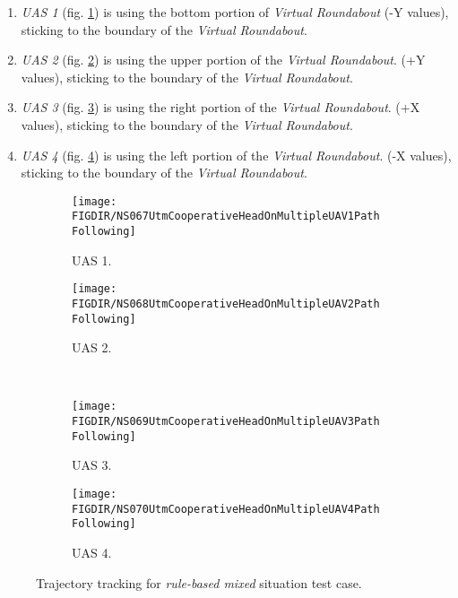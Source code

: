 \begin{enumerate}
	\item \emph{UAS 1} (fig. \ref{fig:ruleBasedMixedPathTrackingUAS1}) is using the bottom portion of \emph{Virtual Roundabout} (-Y values), sticking to the boundary of the \emph{Virtual Roundabout}.
	
	\item \emph{UAS 2} (fig. \ref{fig:ruleBasedMixedPathTrackingUAS2}) is using the upper portion of the \emph{Virtual Roundabout}. (+Y values), sticking to the boundary of the \emph{Virtual Roundabout}.
	
	\item \emph{UAS 3} (fig. \ref{fig:ruleBasedMixedPathTrackingUAS3}) is using the right portion of the \emph{Virtual Roundabout}. (+X values), sticking to the boundary of the \emph{Virtual Roundabout}.
	
	\item \emph{UAS 4} (fig. \ref{fig:ruleBasedMixedPathTrackingUAS4}) is using the left portion of the \emph{Virtual Roundabout}. (-X values), sticking to the boundary of the \emph{Virtual Roundabout}.
\end{enumerate}

\begin{figure}[H]
	\centering
	\begin{subfigure}{0.48\textwidth}
		\centering
		\texttt{[image: \\FIGDIR/NS067UtmCooperativeHeadOnMultipleUAV1PathFollowing]}
		\caption{UAS 1.}
		\label{fig:ruleBasedMixedPathTrackingUAS1}
	\end{subfigure}
	\begin{subfigure}{0.48\textwidth}
		\centering
		\texttt{[image: \\FIGDIR/NS068UtmCooperativeHeadOnMultipleUAV2PathFollowing]} 
		\caption{UAS 2.}
		\label{fig:ruleBasedMixedPathTrackingUAS2}
	\end{subfigure}
	\\
	\begin{subfigure}{0.48\textwidth}
		\centering
		\texttt{[image: \\FIGDIR/NS069UtmCooperativeHeadOnMultipleUAV3PathFollowing]} 
		\caption{UAS 3.}
		\label{fig:ruleBasedMixedPathTrackingUAS3}
	\end{subfigure}
	\begin{subfigure}{0.48\textwidth}
		\centering
		\texttt{[image: \\FIGDIR/NS070UtmCooperativeHeadOnMultipleUAV4PathFollowing]} 
		\caption{UAS 4.}
		\label{fig:ruleBasedMixedPathTrackingUAS4}
	\end{subfigure}
	\caption{Trajectory tracking for \emph{rule-based mixed} situation test case.}
	\label{fig:testCaseRuleBasedMixedTrajectoryTracking}
\end{figure}

